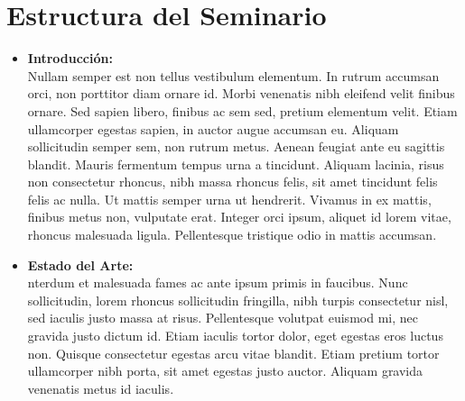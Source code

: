 \section{Estructura del Seminario}
\begin{itemize}
\item \textbf{Introducción:} \\
Nullam semper est non tellus vestibulum elementum. In rutrum accumsan orci, non porttitor diam ornare id. Morbi venenatis nibh eleifend velit finibus ornare. Sed sapien libero, finibus ac sem sed, pretium elementum velit. Etiam ullamcorper egestas sapien, in auctor augue accumsan eu. Aliquam sollicitudin semper sem, non rutrum metus. Aenean feugiat ante eu sagittis blandit. Mauris fermentum tempus urna a tincidunt. Aliquam lacinia, risus non consectetur rhoncus, nibh massa rhoncus felis, sit amet tincidunt felis felis ac nulla. Ut mattis semper urna ut hendrerit. Vivamus in ex mattis, finibus metus non, vulputate erat. Integer orci ipsum, aliquet id lorem vitae, rhoncus malesuada ligula. Pellentesque tristique odio in mattis accumsan. 


\item \textbf{Estado del Arte:} \\
nterdum et malesuada fames ac ante ipsum primis in faucibus. Nunc sollicitudin, lorem rhoncus sollicitudin fringilla, nibh turpis consectetur nisl, sed iaculis justo massa at risus. Pellentesque volutpat euismod mi, nec gravida justo dictum id. Etiam iaculis tortor dolor, eget egestas eros luctus non. Quisque consectetur egestas arcu vitae blandit. Etiam pretium tortor ullamcorper nibh porta, sit amet egestas justo auctor. Aliquam gravida venenatis metus id iaculis. 


\end{itemize}
